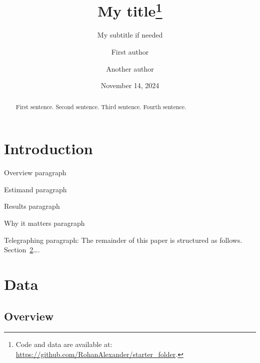 \documentclass[
  letterpaper,
  DIV=11,
  numbers=noendperiod]{scrartcl}
\title{My title\thanks{Code and data are available at:
\url{https://github.com/RohanAlexander/starter_folder}.}}
\subtitle{My subtitle if needed}
\author{First author \and Another author}
\date{November 14, 2024}
\begin{document}
\maketitle
\begin{abstract}
First sentence. Second sentence. Third sentence. Fourth sentence.
\end{abstract}


\section{Introduction}\label{introduction}

Overview paragraph

Estimand paragraph

Results paragraph

Why it matters paragraph

Telegraphing paragraph: The remainder of this paper is structured as
follows. Section~\ref{sec-data}\ldots.

\section{Data}\label{sec-data}

\subsection{Overview}\label{overview}
\end{document}
